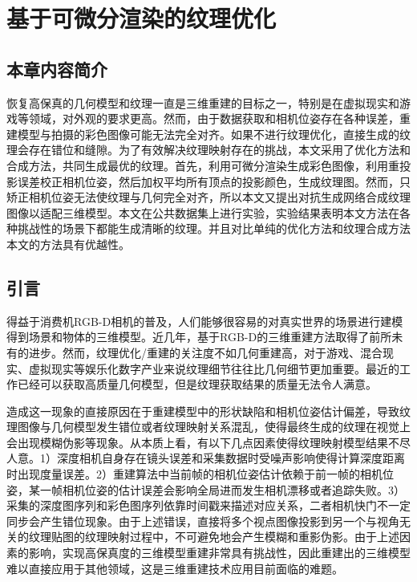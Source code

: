 \setcounter{figure}{0}
\setcounter{table}{0}
\setcounter{algocf}{0}



\chapter{基于可微分渲染的纹理优化}
\section{本章内容简介}

恢复高保真的几何模型和纹理一直是三维重建的目标之一，特别是在虚拟现实和游戏等领域，对外观的要求更高。然而，由于数据获取和相机位姿存在各种误差，重建模型与拍摄的彩色图像可能无法完全对齐。如果不进行纹理优化，直接生成的纹理会存在错位和缝隙。为了有效解决纹理映射存在的挑战，本文采用了优化方法和合成方法，共同生成最优的纹理。首先，利用可微分渲染生成彩色图像，利用重投影误差校正相机位姿，然后加权平均所有顶点的投影颜色，生成纹理图。然而，只矫正相机位姿无法使纹理与几何完全对齐，所以本文又提出对抗生成网络合成纹理图像以适配三维模型。本文在公共数据集上进行实验，实验结果表明本文方法在各种挑战性的场景下都能生成清晰的纹理。并且对比单纯的优化方法和纹理合成方法本文的方法具有优越性。
\section{引言}


得益于消费机RGB-D相机的普及，人们能够很容易的对真实世界的场景进行建模得到场景和物体的三维模型。近几年，基于RGB-D的三维重建方法取得了前所未有的进步。然而，纹理优化/重建的关注度不如几何重建高，对于游戏、混合现实、虚拟现实等娱乐化数字产业来说纹理细节往往比几何细节更加重要。最近的工作已经可以获取高质量几何模型，但是纹理获取结果的质量无法令人满意。\par

造成这一现象的直接原因在于重建模型中的形状缺陷和相机位姿估计偏差，导致纹理图像与几何模型发生错位或者纹理映射关系混乱，使得最终生成的纹理在视觉上会出现模糊伪影等现象。从本质上看，有以下几点因素使得纹理映射模型结果不尽人意。1）深度相机自身存在镜头误差和采集数据时受噪声影响使得计算深度距离时出现度量误差。2）重建算法中当前帧的相机位姿估计依赖于前一帧的相机位姿，某一帧相机位姿的估计误差会影响全局进而发生相机漂移或者追踪失败。3）采集的深度图序列和彩色图序列依靠时间戳来描述对应关系，二者相机快门不一定同步会产生错位现象。由于上述错误，直接将多个视点图像投影到另一个与视角无关的纹理贴图的纹理映射过程中，不可避免地会产生模糊和重影伪影。由于上述因素的影响，实现高保真度的三维模型重建非常具有挑战性，因此重建出的三维模型难以直接应用于其他领域，这是三维重建技术应用目前面临的难题。\par

